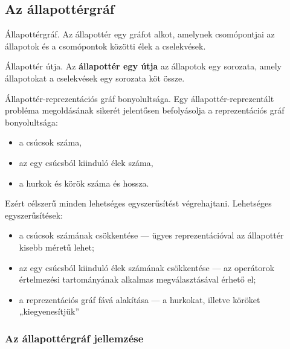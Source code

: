 \subsection{Az állapottérgráf}

\begin{definicio}
    Állapottérgráf.
    Az állapottér egy gráfot alkot,
    amelynek csomópontjai az állapotok és a csomópontok közötti élek a
    cselekvések.


\end{definicio}

\begin{definicio}
    Állapottér útja.
    Az \textbf{állapottér egy útja} az állapotok egy sorozata, amely
    állapotokat a cselekvések egy sorozata köt össze.
\end{definicio}

\begin{definicio}
    Állapottér-reprezentációs gráf bonyolultsága.  Egy állapottér-reprezentált
    probléma megoldásának sikerét jelentősen befolyásolja a reprezentációs gráf
    bonyolultsága:

    \begin{itemize}
        \item a csúcsok száma,
        \item az egy csúcsból kiinduló élek száma,
        \item a hurkok és körök száma és hossza.
    \end{itemize}

    Ezért célszerű minden lehetséges egyszerűsítést végrehajtani. Lehetséges
    egyszerűsítések:

    \begin{itemize}
        \item a csúcsok számának csökkentése — ügyes reprezentációval az
            állapottér kisebb méretű lehet;
        \item az egy csúcsból kiinduló élek számának csökkentése — az
            operátorok értelmezési tartományának alkalmas megválasztásával
            érhető el;
        \item a reprezentációs gráf fává alakítása — a hurkokat, illetve
            köröket „kiegyenesítjük”
    \end{itemize}
\end{definicio}

\subsubsection{Az állapottérgráf jellemzése}

